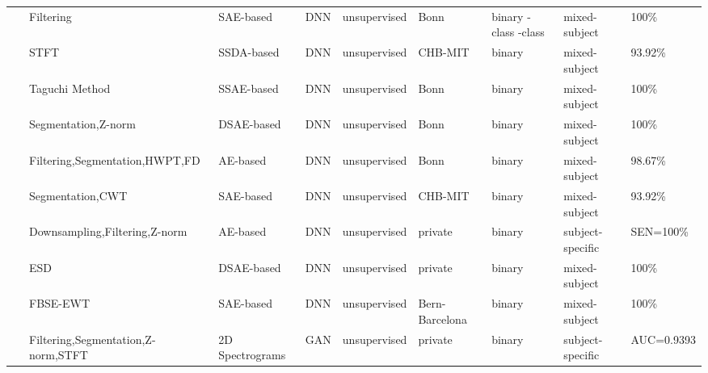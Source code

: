\begin{table*}[ht]
\begin{tabular}{p{0.4cm}p{2.8cm}p{2cm}p{1.5cm}p{1.9cm}p{1.9cm}p{0.8cm}p{1.8cm}p{1.5cm}}
~\cite{Seizure207} & Filtering & SAE-based & DNN & unsupervised & Bonn & binary \newline
3-class \newline
5-class & mixed-subject & 100\% \\
~\cite{Seizure208} & STFT & SSDA-based & DNN & unsupervised & CHB-MIT & binary & mixed-subject & 93.92\% \\
~\cite{Seizure209} & Taguchi Method & SSAE-based & DNN & unsupervised & Bonn & binary & mixed-subject & 100\% \\
~\cite{Seizure210} & Segmentation,Z-norm & DSAE-based & DNN & unsupervised & Bonn & binary & mixed-subject & 100\% \\
~\cite{Seizure211} & Filtering,Segmentation,\newline HWPT,FD & AE-based & DNN & unsupervised & Bonn & binary & mixed-subject & 98.67\% \\
~\cite{Seizure212} & Segmentation,CWT & SAE-based & DNN & unsupervised & CHB-MIT & binary & mixed-subject & 93.92\% \\
~\cite{Seizure213} & Downsampling,Filtering,\newline Z-norm & AE-based & DNN & unsupervised & private & binary & subject-specific & SEN=100\% \\
~\cite{Seizure214} & ESD & DSAE-based & DNN & unsupervised & private & binary & mixed-subject & 100\% \\
~\cite{9096344} & FBSE-EWT & SAE-based & DNN & unsupervised & Bern-Barcelona & binary & mixed-subject & 100\% \\
~\cite{you2020unsupervised} & Filtering,Segmentation,\newline Z-norm,STFT & 2D Spectrograms & GAN & unsupervised & private & binary & subject-specific & AUC=0.9393 \\

\hline
\end{tabular}
\end{table*}

